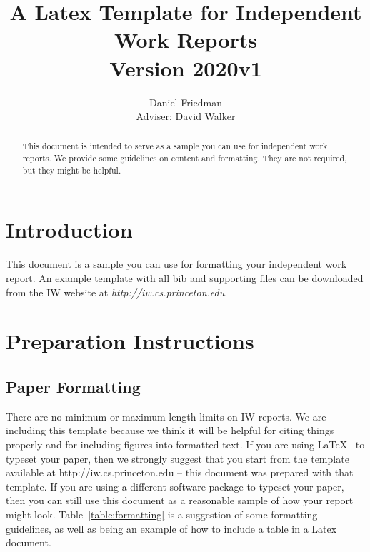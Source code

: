 \documentclass[pageno]{jpaper}
\begin{document}
\title{
  A Latex Template for Independent Work Reports\\
  Version 2020v1}

\author{Daniel Friedman\\Adviser: David Walker}

\date{}
\maketitle

\thispagestyle{empty}
\doublespacing
\begin{abstract}
  This document is intended to serve as a sample you can use for independent work reports.  We provide some guidelines on content and formatting.  They are not required, but they might be helpful.
\end{abstract}

\section{Introduction}

This document is a sample you can use for formatting your independent work
report.  An example template with all bib and supporting files can be downloaded
from the IW website at {\em http://iw.cs.princeton.edu}.

\section{Preparation Instructions}

\subsection{Paper Formatting}
\label{section:formatting}

There are no minimum or maximum length limits on IW reports.
We are including this template because we think it will be helpful
for citing things properly and for including figures into formatted
text.  If you are using \LaTeX~\cite{lamport94}
to typeset your paper, then we strongly suggest
that you start from the template available at
http://iw.cs.princeton.edu -- this
document was prepared with that template.
If you are using a different software package to typeset your paper,
then you can still use this document as a reasonable sample of
how your report might look.  Table~\ref{table:formatting} is a suggestion
of some formatting guidelines, as well as being an example of how to
include a table in a Latex document.
\end{document}
